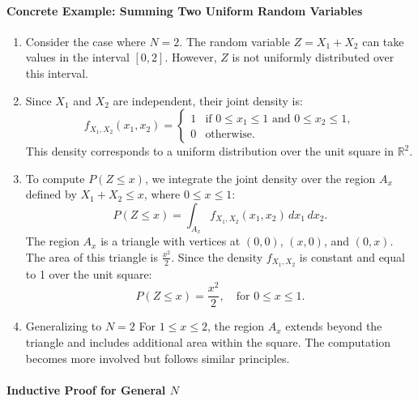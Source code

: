 \paragraph{Concrete Example: Summing Two Uniform Random Variables}
\begin{enumerate}
    \item Consider the case where \( N = 2 \). The random variable \( Z = X_1 + X_2 \) can take values in the interval \([0, 2]\). However, \( Z \) is not uniformly distributed over this interval.
    \item Since \( X_1 \) and \( X_2 \) are independent, their joint density is:
\[
f_{X_1, X_2}(x_1, x_2) = 
\begin{cases} 
1 & \text{if } 0 \leq x_1 \leq 1 \text{ and } 0 \leq x_2 \leq 1, \\
0 & \text{otherwise}.
\end{cases}
\]
This density corresponds to a uniform distribution over the unit square in \( \mathbb{R}^2 \).
    \item To compute \( P(Z \leq x) \), we integrate the joint density over the region \( A_x \) defined by \( X_1 + X_2 \leq x \), where \( 0 \leq x \leq 1 \):
\[
P(Z \leq x) = \int_{A_x} f_{X_1, X_2}(x_1, x_2) \, dx_1 \, dx_2.
\]
The region \( A_x \) is a triangle with vertices at \((0, 0)\), \((x, 0)\), and \((0, x)\). The area of this triangle is \( \frac{x^2}{2} \). Since the density \( f_{X_1, X_2} \) is constant and equal to 1 over the unit square:
\[
P(Z \leq x) = \frac{x^2}{2}, \quad \text{for } 0 \leq x \leq 1.
\]
    \item Generalizing to \( N = 2 \)
For \( 1 \leq x \leq 2 \), the region \( A_x \) extends beyond the triangle and includes additional area within the square. The computation becomes more involved but follows similar principles.
\end{enumerate}

\paragraph{Inductive Proof for General \( N \)}

